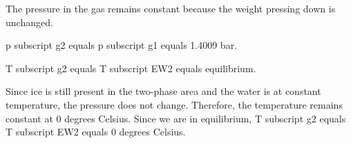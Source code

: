 The pressure in the gas remains constant because the weight pressing down is unchanged.  

p subscript g2 equals p subscript g1 equals 1.4009 bar.  

T subscript g2 equals T subscript EW2 equals equilibrium.  

Since ice is still present in the two-phase area and the water is at constant temperature, the pressure does not change. Therefore, the temperature remains constant at 0 degrees Celsius. Since we are in equilibrium, T subscript g2 equals T subscript EW2 equals 0 degrees Celsius.